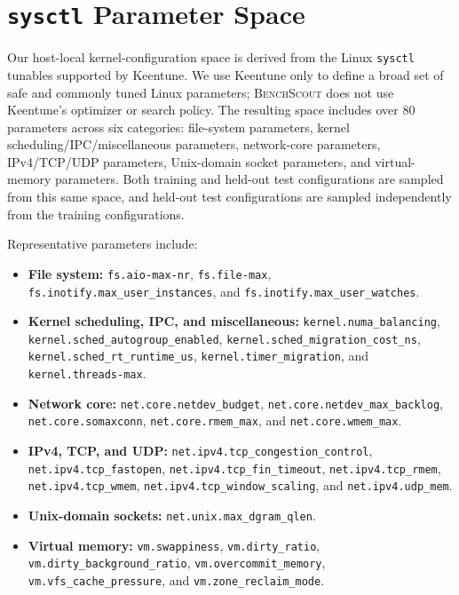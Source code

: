\documentclass[sigplan,10pt]{acmart}
\newcommand{\ourmethod}{\textsc{BenchScout}\xspace}
\newcommand{\sysctl}[1]{\texttt{\nolinkurl{#1}}}
\begin{document}
\clearpage


\clearpage
\appendix
\section{\texttt{sysctl} Parameter Space}
\label{app:sysctl-space}

Our host-local kernel-configuration space is derived from the Linux \sysctl{sysctl} tunables supported by Keentune.
We use Keentune only to define a broad set of safe and commonly tuned Linux parameters; \ourmethod{} does not use Keentune's optimizer or search policy.
The resulting space includes over 80 parameters across six categories: file-system parameters, kernel scheduling/IPC/miscellaneous parameters, network-core parameters, IPv4/TCP/UDP parameters, Unix-domain socket parameters, and virtual-memory parameters.
Both training and held-out test configurations are sampled from this same space, and held-out test configurations are sampled independently from the training configurations.

Representative parameters include:
\begin{itemize}
    \item \textbf{File system:}
    \sysctl{fs.aio-max-nr},
    \sysctl{fs.file-max},
    \sysctl{fs.inotify.max_user_instances},
    and \sysctl{fs.inotify.max_user_watches}.

    \item \textbf{Kernel scheduling, IPC, and miscellaneous:}
    \sysctl{kernel.numa_balancing},
    \sysctl{kernel.sched_autogroup_enabled},
    \sysctl{kernel.sched_migration_cost_ns},
    \sysctl{kernel.sched_rt_runtime_us},
    \sysctl{kernel.timer_migration},
    and \sysctl{kernel.threads-max}.

    \item \textbf{Network core:}
    \sysctl{net.core.netdev_budget},
    \sysctl{net.core.netdev_max_backlog},
    \sysctl{net.core.somaxconn},
    \sysctl{net.core.rmem_max},
    and \sysctl{net.core.wmem_max}.

    \item \textbf{IPv4, TCP, and UDP:}
    \sysctl{net.ipv4.tcp_congestion_control},
    \sysctl{net.ipv4.tcp_fastopen},
    \sysctl{net.ipv4.tcp_fin_timeout},
    \sysctl{net.ipv4.tcp_rmem},
    \sysctl{net.ipv4.tcp_wmem},
    \sysctl{net.ipv4.tcp_window_scaling},
    and \sysctl{net.ipv4.udp_mem}.

    \item \textbf{Unix-domain sockets:}
    \sysctl{net.unix.max_dgram_qlen}.

    \item \textbf{Virtual memory:}
    \sysctl{vm.swappiness},
    \sysctl{vm.dirty_ratio},
    \sysctl{vm.dirty_background_ratio},
    \sysctl{vm.overcommit_memory},
    \sysctl{vm.vfs_cache_pressure},
    and \sysctl{vm.zone_reclaim_mode}.
\end{itemize}
\end{document}
